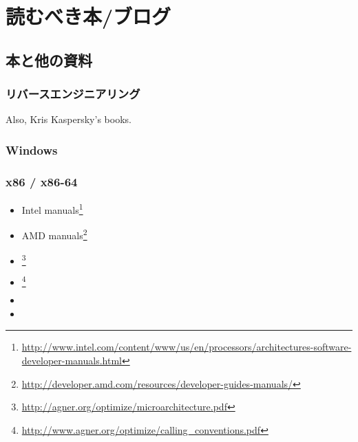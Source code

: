 \chapter{読むべき本/ブログ}

\section{本と他の資料}

\subsection{リバースエンジニアリング}



Also, Kris Kaspersky's books.

\subsection{Windows}



\subsection{\CCpp}



\subsection{x86 / x86-64}

\label{x86_manuals}
\begin{itemize}
\item Intel manuals\footnote{\AlsoAvailableAs \url{http://www.intel.com/content/www/us/en/processors/architectures-software-developer-manuals.html}}

\item AMD manuals\footnote{\AlsoAvailableAs \url{http://developer.amd.com/resources/developer-guides-manuals/}}

\item \AgnerFog{}\footnote{\AlsoAvailableAs \url{http://agner.org/optimize/microarchitecture.pdf}}

\item \AgnerFogCC{}\footnote{\AlsoAvailableAs \url{http://www.agner.org/optimize/calling_conventions.pdf}}

\item \IntelOptimization

\item \AMDOptimization
\end{itemize}

